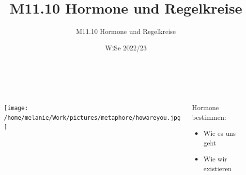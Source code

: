 \documentclass{beamer}
\title[M11.10 Hormone, Regelkreise]{M11.10 Hormone und Regelkreise}
\author[melanie.stefan@medicalschool-berlin.de]{M11.10 Hormone und Regelkreise}
\institute[]{Prof. Melanie Stefan - melanie.stefan@medcialschool-berlin.de}
\date{WiSe 2022/23}
\begin{document}
  {  
\begin{frame}

 \maketitle 

$\,$\\[6cm] 


\end{frame} 
}






\begin{frame}

\begin{columns}[c]
\begin{column}{5cm}
\texttt{[image: /home/melanie/Work/pictures/metaphore/howareyou.jpg]}

\end{column}

\pause

\begin{column}{5cm}
Hormone bestimmen:

\begin{itemize}
\item
Wie es uns geht
\item
Wie wir existieren
\end{itemize}

\end{column}
\end{columns}

\end{frame}



\end{document}
